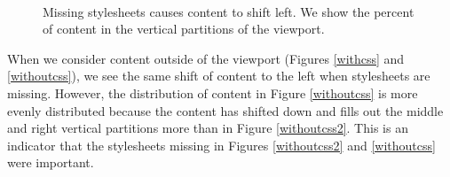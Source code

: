 \begin{figure}[h!]
  \begin{center}
    \\
  \end{center}
  \label{pilotexample2}
  \caption{Missing stylesheets causes content to shift left. We show the percent of content in the vertical partitions of the viewport.}
\end{figure}

When we consider content outside of the viewport (Figures \ref{withcss} and \ref{withoutcss}), we see the same shift of content to the left when stylesheets are missing. However, the distribution of content in Figure \ref{withoutcss} is more evenly distributed because the content has shifted down and fills out the middle and right vertical partitions more than in Figure \ref{withoutcss2}. This is an indicator that the stylesheets missing in Figures \ref{withoutcss2} and \ref{withoutcss} were important.

